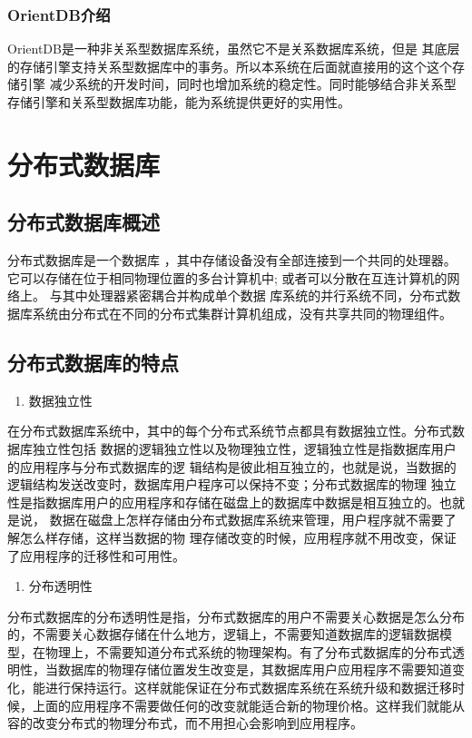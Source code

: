 \subsubsection{OrientDB介绍}
OrientDB是一种非关系型数据库系统，虽然它不是关系数据库系统，但是
其底层的存储引擎支持关系型数据库中的事务。所以本系统在后面就直接用的这个这个存储引擎
减少系统的开发时间，同时也增加系统的稳定性。同时能够结合非关系型存储引擎和关系型数据库功能，能为系统提供更好的实用性。
\section{分布式数据库}
\subsection{分布式数据库概述}
分布式数据库是一个数据库
，其中存储设备没有全部连接到一个共同的处理器。
它可以存储在位于相同物理位置的多台计算机中; 
或者可以分散在互连计算机的网络上。
与其中处理器紧密耦合并构成单个数据
库系统的并行系统不同，分布式数据库系统由分布式在不同的分布式集群计算机组成，没有共享共同的物理组件。
\subsection{分布式数据库的特点}

	\begin{enumerate}
		\item 数据独立性
	\end{enumerate}

	在分布式数据库系统中，其中的每个分布式系统节点都具有数据独立性。分布式数据库独立性包括
	数据的逻辑独立性以及物理独立性，逻辑独立性是指数据库用户的应用程序与分布式数据库的逻
	辑结构是彼此相互独立的，也就是说，当数据的逻辑结构发送改变时，数据库用户程序可以保持不变；分布式数据库的物理
	独立性是指数据库用户的应用程序和存储在磁盘上的数据库中数据是相互独立的。也就是说，
	数据在磁盘上怎样存储由分布式数据库系统来管理，用户程序就不需要了解怎么样存储，这样当数据的物
	理存储改变的时候，应用程序就不用改变，保证了应用程序的迁移性和可用性。
	

	\begin{enumerate}[resume]
		\item 分布透明性
	\end{enumerate}

	分布式数据库的分布透明性是指，分布式数据库的用户不需要关心数据是怎么分布的，不需要关心数据存储在什么地方，逻辑上，不需要知道数据库的逻辑数据模型，在物理上，不需要知道分布式系统的物理架构。有了分布式数据库的分布式透明性，当数据库的物理存储位置发生改变是，其数据库用户应用程序不需要知道变化，能进行保持运行。这样就能保证在分布式数据库系统在系统升级和数据迁移时候，上面的应用程序不需要做任何的改变就能适合新的物理价格。这样我们就能从容的改变分布式的物理分布式，而不用担心会影响到应用程序。

